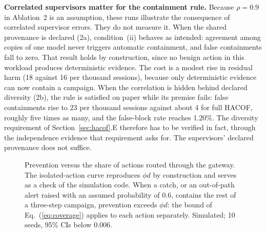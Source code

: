 \documentclass{ieeeaccess}
\newcommand{\hacof}{HACOF}
\begin{document}
\textbf{Correlated supervisors matter for the containment rule.} Because $\rho=0.9$ in Ablation~2 is an assumption, these runs illustrate the consequence of correlated supervisor errors. They do not measure it. When the shared provenance is declared (2a), condition~(ii) behaves as intended: agreement among copies of one model never triggers automatic containment, and false containments fall to zero. That result holds by construction, since no benign action in this workload produces deterministic evidence. The cost is a modest rise in residual harm (18 against 16 per thousand sessions), because only deterministic evidence can now contain a campaign. When the correlation is hidden behind declared diversity (2b), the rule is satisfied on paper while its premise fails: false containments rise to 23 per thousand sessions against about 4 for full \hacof{}, roughly five times as many, and the false-block rate reaches 1.20\%. The diversity requirement of Section~\ref{sec:hacof}.E therefore has to be verified in fact, through the independence evidence that requirement asks for. The supervisors' declared provenance does not suffice.

\begin{figure}[!t]
\centering
{}
\caption{Prevention versus the share of actions routed through the gateway. The isolated-action curve reproduces $\phi d$ by construction and serves as a check of the simulation code. When a catch, or an out-of-path alert raised with an assumed probability of 0.6, contains the rest of a three-step campaign, prevention exceeds $\phi d$: the bound of Eq.~(\ref{eq:coverage}) applies to each action separately. Simulated; 10 seeds, 95\% CIs below 0.006.}
\label{fig:simcoverage}
\end{figure}
\end{document}
